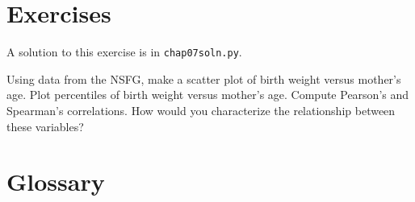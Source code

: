 \documentclass[12pt]{book}
\begin{document}
\section{Exercises}

A solution to this exercise is in \verb"chap07soln.py".

\begin{exercise}
Using data from the NSFG, make a scatter plot of birth weight
versus mother's age.  Plot percentiles of birth weight
versus mother's age.  Compute Pearson's and Spearman's correlations.
How would you characterize the relationship
between these variables?
\end{exercise}


\section{Glossary}
\end{document}
